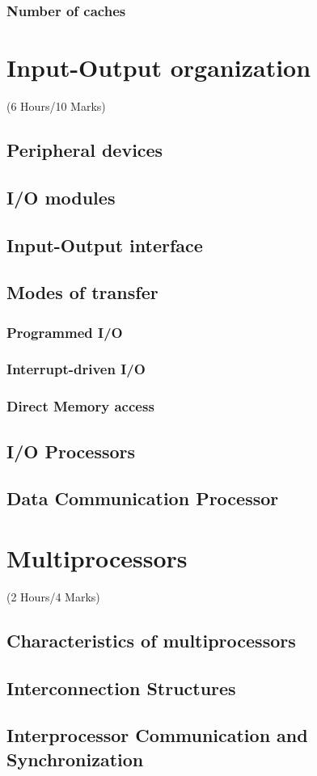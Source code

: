 \documentclass[12pt]{article}
\begin{document}
\subsubsection{Number of caches}

\pagebreak
\section{Input-Output organization}
\begin{center}(6 Hours/10 Marks)\end{center}
\subsection{Peripheral devices}
\subsection{I/O modules}
\subsection{Input-Output interface}
\subsection{Modes of transfer}
\subsubsection{Programmed I/O}
\subsubsection{Interrupt-driven I/O}
\subsubsection{Direct Memory access}
\subsection{I/O Processors}
\subsection{Data Communication Processor}

\pagebreak
\section{Multiprocessors}
\begin{center}(2 Hours/4 Marks)\end{center}
\subsection{Characteristics of multiprocessors}
\subsection{Interconnection Structures}
\subsection{Interprocessor Communication and Synchronization}
\end{document}
